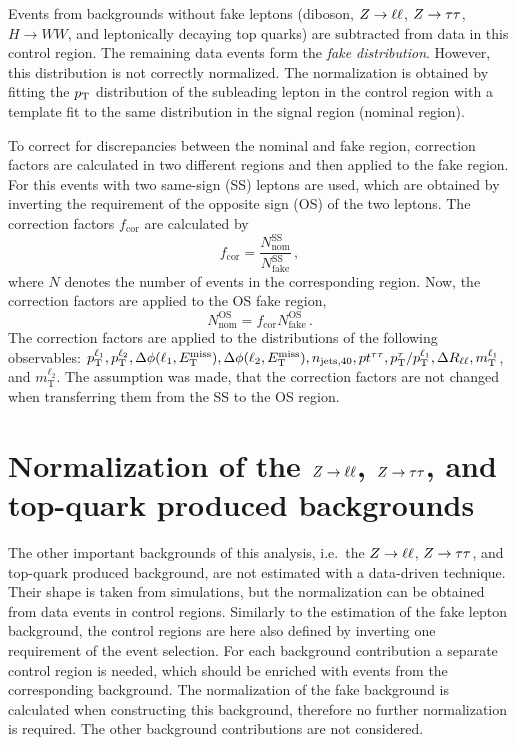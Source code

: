 Events from backgrounds without fake leptons (diboson, $Z \to \ell \ell$, $Z \to \tau \tau$, $H\to WW$, and leptonically decaying top quarks) are subtracted from data in this control region.
The remaining data events form the  \emph{fake distribution}.
However, this distribution is not correctly normalized.
The normalization is obtained by fitting the $p_\text{T}$ distribution of the subleading lepton in the control region
with a template fit to the same distribution in the signal region (nominal region).

To correct for discrepancies between the nominal and fake region, correction factors are calculated in two different regions
and then applied to the fake region.
For this events with two same-sign (SS) leptons are used, which are obtained by inverting the requirement of the opposite sign (OS)
of the two leptons.
The correction factors $f_\text{cor}$ are calculated by
\begin{equation}
    f_\text{cor} = \frac{N^\text{SS}_\text{nom}}{N^\text{SS}_\text{fake}} \,,
\end{equation}
where $N$ denotes the number of events in the corresponding region.
Now, the correction factors are applied to the OS fake region,
\begin{equation}
    N^\text{OS}_\text{nom} = f_\text{cor} N^\text{OS}_\text{fake} \,.
\end{equation}
The correction factors are applied to the distributions of the following observables:
$p_\text{T}^{\ell_1}, p_\text{T}^{\ell_2}, \Delta \phi (\ell_1, E_\text{T}^\text{miss}), \Delta \phi (\ell_2, E_\text{T}^\text{miss}), n_{\text{jets},40}, pt^{\tau\tau}, p_\text{T}^\tau / p_\text{T}^{\ell_1}, \Delta R_{\ell\ell}, m_\text{T}^{\ell_1}$, and $m_\text{T}^{\ell_2}$.
The assumption was made, that the correction factors are not changed when transferring them from the SS to the OS region.

\section{Normalization of the $Z \to \ell \ell$, $Z \to \tau \tau$, and top-quark produced backgrounds}\label{sec:background_estimation:normalization}

The other important backgrounds of this analysis, i.e.\ the $Z \to \ell \ell$, $Z \to \tau \tau$, and top-quark produced background, are not estimated with
a data-driven technique.
Their shape is taken from simulations, but the normalization can be obtained from data events in control regions.
Similarly to the estimation of the fake lepton background, the control regions are here also defined by inverting one requirement of the event selection.
For each background contribution a separate control region is needed, which should be enriched with events from the corresponding background.
The normalization of the fake background is calculated when constructing this background, therefore no further normalization is required.
The other background contributions are not considered.


